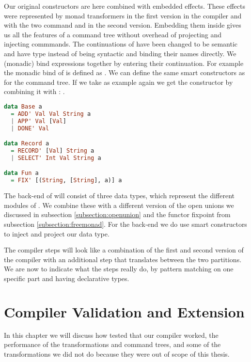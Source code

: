 Our original constructors are here combined with embedded effects. These effects were represented by monad transformers in the first version in the compiler and with the two command  and  in the second version. Embedding them inside gives us all the features of a command tree without overhead of projecting and injecting commmands. The continuations of  have been changed to be semantic and have type  instead of being syntactic and binding their names directly. We (monadic) bind expressions together by entering their continuation. For example the monadic bind of  is defined as . We can define the same smart constructors as for the command tree. If we take  as example again we get the constructor by combining it with : .

\begin{lstlisting}[language=Haskell]
data Base a
  = ADD' Val Val String a
  | APP' Val [Val]
  | DONE' Val

data Record a
  = RECORD' [Val] String a
  | SELECT' Int Val String a

data Fun a
  = FIX' [(String, [String], a)] a
\end{lstlisting}

The back-end of will consist of three data types, which represent the different modules of . We combine these with a different version of the open unions we discussed in subsection \ref{subsection:openunion} and the functor fixpoint  from subsection \ref{subsection:freemonad}. For the back-end we do use smart constructors to inject and project our data type.

The compiler steps will look like a combination of the first and second version of the compiler with an additional step that translates between the two  partitions. We are now to indicate what the steps really do, by pattern matching on one specific part and having declarative types.

\section{Compiler Validation and Extension}
In this chapter we will discuss how tested that our compiler worked, the performance of the transformations and command trees, and some of the transformations we did not do because they were out of scope of this thesis.

